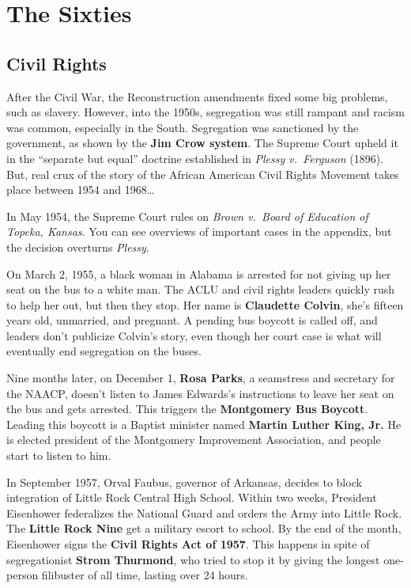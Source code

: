 \section{The Sixties}

\subsection*{Civil Rights}

After the Civil War, the Reconstruction amendments fixed some big problems, such as slavery.
However, into the 1950s, segregation was still rampant and racism was common, especially in the South.
Segregation was sanctioned by the government, as shown by the \textbf{Jim Crow system}.
The Supreme Court upheld it in the ``separate but equal'' doctrine
established in \textit{Plessy v.\ Ferguson} (1896).
But, real crux of the story of the African American Civil Rights Movement takes place between 1954 and 1968\ldots{}

In May 1954, the Supreme Court rules on \textit{Brown v.\ Board of Education of Topeka, Kansas}.
You can see overviews of important cases in the appendix, but the decision overturns \textit{Plessy}.

On March 2, 1955, a black woman in Alabama is arrested for not giving up her seat on the bus to a white man.
The ACLU and civil rights leaders quickly rush to help her out, but then they stop.
Her name is \textbf{Claudette Colvin}, she's fifteen years old, unmarried, and pregnant.
A pending bus boycott is called off, and leaders don't publicize Colvin's story,
even though her court case is what will eventually end segregation on the buses.

Nine months later, on December 1, \textbf{Rosa Parks}, a seamstress and secretary for the NAACP,
doesn't listen to James Edwards's instructions to leave her seat on the bus and gets arrested.
This triggers the \textbf{Montgomery Bus Boycott}.
Leading this boycott is a Baptist minister named \textbf{Martin Luther King, Jr.}
He is elected president of the Montgomery Improvement Association, and people start to listen to him.

In September 1957, Orval Faubus, governor of Arkansas,
decides to block integration of Little Rock Central High School.
Within two weeks, President Eisenhower federalizes the National Guard and orders the Army into Little Rock.
The \textbf{Little Rock Nine} get a military escort to school.
By the end of the month, Eisenhower signs the \textbf{Civil Rights Act of 1957}.
This happens in spite of segregationist \textbf{Strom Thurmond},
who tried to stop it by giving the longest one-person filibuster of all time, lasting over 24 hours.


